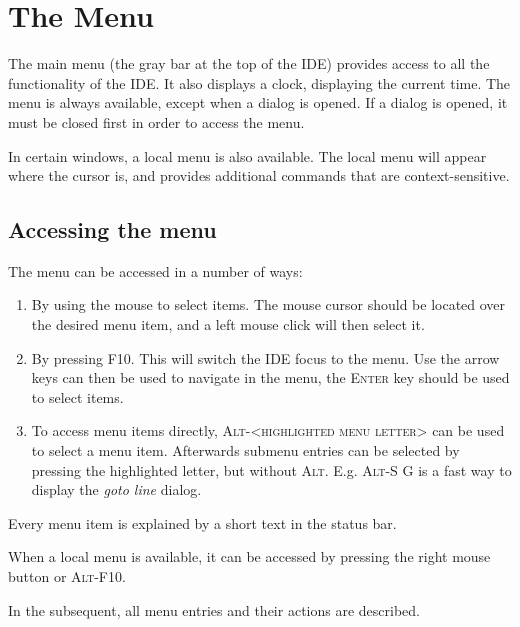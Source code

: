 \section{The Menu}
\label{se:idemenu}
The main menu (the gray bar at the top of the IDE) provides access to all the
functionality of the IDE. It also displays a clock, displaying the current
time. The menu is always available, except when a dialog is opened. If a
dialog is opened, it must be closed first in order to access the menu.

In certain windows, a local menu is also available. The local menu will
appear where the cursor is, and provides additional commands that are 
context-sensitive.
%
%
\subsection{Accessing the menu}
The menu can be accessed in a number of ways:
\begin{enumerate}
\item By using the mouse to select items. The mouse cursor should be located
over the desired menu item, and a left mouse click will then select it.
\item By pressing \textsc{F10}. This will switch the IDE focus to the menu. 
Use the arrow keys can then be used to navigate in the menu, the 
\textsc{Enter} key should be used to select items.
\item To access menu items directly, \textsc{Alt-<highlighted menu letter>}
can be used to select a menu item. Afterwards submenu entries can be selected 
by pressing the highlighted letter, but without \textsc{Alt}. 
E.g. \textsc{Alt-S G} is a fast way to display the \emph{goto line} dialog.
\end{enumerate}
Every menu item is explained by a short text in the status bar.

When a local menu is available, it can be accessed by pressing
the right mouse button or \textsc{Alt-F10}. 

In the subsequent, all menu entries and their actions are described.
%
%

